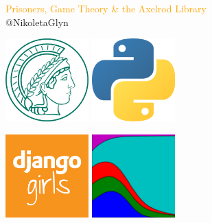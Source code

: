 \documentclass{beamer}
\begin{document}
\begin{frame}
    \begin{center}
        \large{\textcolor{orange}{Prisoners, Game Theory \& the Axelrod Library}} \\

        \vspace{1cm}
        \normalsize{@NikoletaGlyn}

    \end{center}
\end{frame}

\begin{frame}
    \begin{center}
    \includegraphics[width=0.24\textwidth]{static/mpi.jpg}\hspace{8pt}
    \includegraphics[width=0.24\textwidth]{static/python.png}\vspace{8pt}

    \includegraphics[width=0.24\textwidth]{static/django_girls.png}\hspace{8pt}
    \includegraphics[width=0.24\textwidth]{static/axelrod-logo.png}
    \end{center}
\end{frame}
\end{document}
